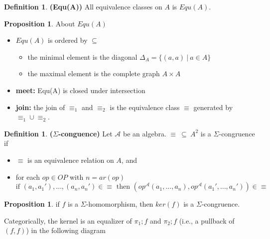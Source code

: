 \documentclass{amsart}
\theoremstyle{definition}
\newtheorem{definition}[thm]{Definition}
\newtheorem{proposition}[thm]{Proposition}
\newcommand{\ca}{\mathcal A} %
\begin{document}
\begin{definition}\textbf{(Equ(A))} All equivalence classes on $A$ is $Equ(A)$. 
\end{definition}

\begin{proposition} About $Equ(A)$
\begin{itemize}
\item $Equ(A)$ is ordered by $\subseteq$
\begin{itemize}
\item the minimal element is the diagonal $\Delta_A = \{(a,a) ~|~ a \in A\}$
\item the maximal element is the complete graph $A\times A$
\end{itemize}
\item \textbf{meet:} Equ(A) is closed under intersection
\item \textbf{join:} the join of $\equiv_1$ and $\equiv_2$ is the equivalence class $\equiv$ generated by $\equiv_1 \cup \equiv_2$.
\end{itemize}
\end{proposition}

\begin{definition}\textbf{($\Sigma$-conguence)} Let $\ca$ be an algebra. $\equiv ~\subseteq~ A^2$ is a $\Sigma$-congruence if
\begin{itemize}
\item $\equiv$ is an equivalence relation on $A$, and 
\item for each $op \in OP$ with $n = ar(op)$
$$ \text{if } (a_1, a_1'), \dots , (a_n, a_n') \in \equiv \text{ then } (op^\ca(a_1, \dots, a_n), op^\ca(a_1', \dots, a_n')) \in \equiv$$
\end{itemize}
\end{definition}

\begin{proposition} if $f$ is a $\Sigma$-homomorphism, then $ker(f)$ is a $\Sigma$-congruence.
\end{proposition}

Categorically, the kernel is an equalizer of $\pi_1;f$ and $\pi_2;f$ (i.e., a pullback of $(f,f)$) in the following diagram
\begin{center}
\end{center}
\end{document}
